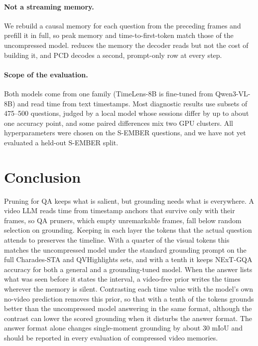 \paragraph{Not a streaming memory.}
We rebuild a causal memory for each question from the preceding frames and prefill it in full, so peak memory and
time-to-first-token match those of the uncompressed model. \method reduces the memory the decoder reads but not the
cost of building it, and PCD decodes a second, prompt-only row at every step. 

\paragraph{Scope of the evaluation.}
Both models come from one family (TimeLens-8B is fine-tuned from Qwen3-VL-8B) and read time from text timestamps.
Most diagnostic results use subsets of 475--500 questions, judged by a local model whose sessions differ by up to
about one accuracy point, and some paired differences mix two GPU clusters. All hyperparameters were chosen on the
S-EMBER questions, and we have not yet evaluated a held-out S-EMBER split. 

\section{Conclusion}
\label{sec:conclusion}

Pruning for QA keeps what is salient, but grounding needs what is everywhere. A video LLM reads time from timestamp
anchors that survive only with their frames, so QA pruners, which empty unremarkable frames, fall below random
selection on grounding. Keeping in each layer the tokens that the actual question attends to preserves the
timeline. With a quarter of the visual tokens this matches the uncompressed model under the standard grounding
prompt on the full Charades-STA and QVHighlights sets, and with a tenth it keeps NExT-GQA accuracy for both a
general and a grounding-tuned model. When the answer lists what was seen before it states the interval, a video-free
prior writes the times wherever the memory is silent. Contrasting each time value with the model's own no-video
prediction removes this prior, so that with a tenth of the tokens \method grounds better than the uncompressed model
answering in the same format, although the contrast can lower the scored grounding when it disturbs the answer
format. The answer format alone changes single-moment grounding by about 30 mIoU and should be reported in every
evaluation of compressed video memories.
